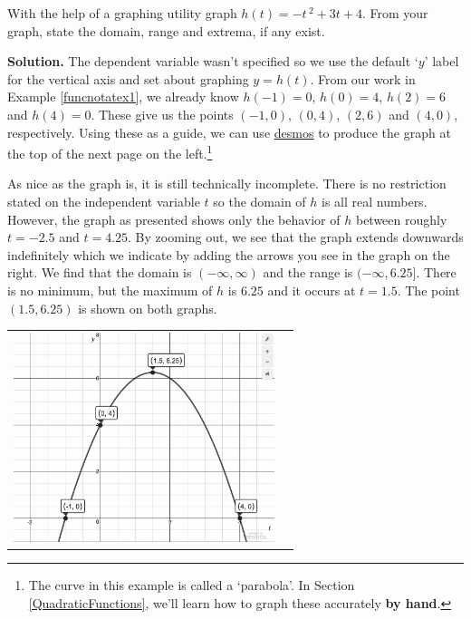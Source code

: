\documentclass{ximera}
\begin{document}
\begin{example} \label{graphalgebraicex}  With the help of a graphing utility graph $h(t) = -t\,^{2} + 3t + 4$.  From your graph, state the domain, range and extrema, if any exist.

{\bf Solution.} The dependent variable wasn't specified so we use the default `$y$' label for the vertical axis and set about graphing $y = h(t)$.   From our work in Example \ref{funcnotatex1},  we already know  $h(-1) = 0$, $h(0) = 4$, $h(2) = 6$ and $h(4) = 0$.  These give us the points $(-1,0)$, $(0,4)$, $(2,6)$ and $(4,0)$, respectively.  Using these as a guide, we can use  \href{https://www.desmos.com/}{\underline{desmos}} to produce the graph at the top of the next page on the left.\footnote{The curve in this example is called a 	`parabola'.  In Section \ref{QuadraticFunctions}, we'll learn how to graph these accurately \textbf{by hand}.} 

\medskip

As nice as the graph is, it is still technically incomplete.  There is no restriction stated on the independent variable $t$ so the domain of $h$ is all real numbers. However, the graph as presented shows only the behavior of $h$ between roughly $t = -2.5$ and $t = 4.25$.  By zooming out, we see that the graph extends downwards indefinitely which we indicate by adding the arrows you see in the graph on the right.  We find that the domain is $(-\infty, \infty)$ and the range is $(-\infty, 6.25]$.  There is no minimum, but the  maximum of $h$ is $6.25$ and it occurs at $t = 1.5$.  The point $(1.5, 6.25)$ is shown on both graphs.

\begin{center}

\begin{tabular}{m{3in}m{2in}}


\includegraphics[width=3in]{./FunctionsandtheirRepresentationsGraphics/ParabolaGraph.jpg}


\end{tabular}
\end{center}
\end{example}
\end{document}

